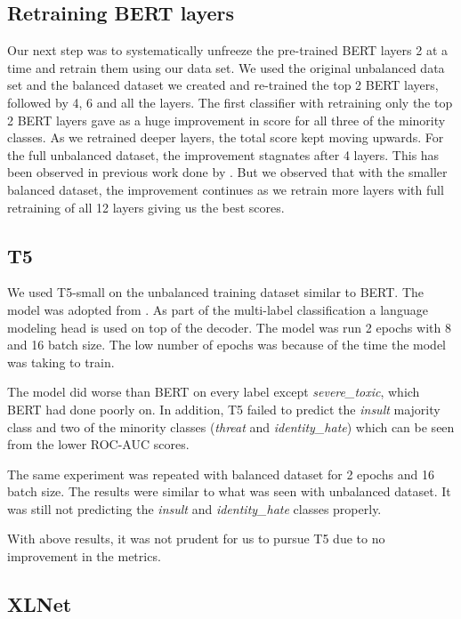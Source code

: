 \documentclass[11pt,a4paper]{article}
\begin{document}
\subsection{Retraining BERT layers}
Our next step was to systematically unfreeze the pre-trained BERT layers 2 at a time and retrain them using our data set. We used the original unbalanced data set and the balanced dataset we created and re-trained the top 2 BERT layers, followed by 4, 6 and all the layers.
The first classifier with retraining only the top 2 BERT layers gave as a huge improvement in score for all three of the minority classes. As we retrained deeper layers, the total score kept moving upwards. For the full unbalanced dataset, the improvement stagnates after 4 layers. This has been observed in previous work done by \citet*{Singh2020HowMD}. But we observed that with the smaller balanced dataset, the improvement continues as we retrain more layers with full retraining of all 12 layers giving us the best scores.


\subsection{T5}
We used T5-small \cite{raffel2020exploring} on the unbalanced training dataset similar to BERT. The model was adopted from \citet*{t5mlcode}. As part of the multi-label classification a language modeling head is used on top of the decoder. The model was run 2 epochs with 8 and 16 batch size. The low number of epochs was because of the time the model was taking to train. 

The model did worse than BERT on every label except \emph{severe\_toxic}, which BERT had done poorly on. 
 In addition, T5 failed to predict the \emph{insult} majority class and two of the minority classes (\emph{threat} and \emph{identity\_hate}) which can be seen from the lower ROC-AUC scores.

The same experiment was repeated with balanced dataset for 2 epochs and 16 batch size. The results were similar to what was seen with unbalanced dataset. It was still not predicting the \emph{insult} and \emph{identity\_hate} classes properly.

With above results, it was not prudent for us to pursue T5 due to no improvement in the metrics.

\subsection{XLNet}
\end{document}
